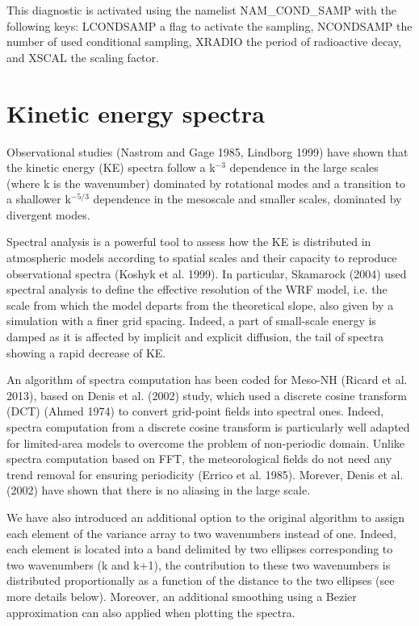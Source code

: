 This diagnostic is activated using the namelist NAM\_COND\_SAMP with the following keys:  LCONDSAMP a flag to activate the sampling, NCONDSAMP the number of used conditional sampling, XRADIO the period of radioactive decay, and XSCAL the scaling factor.
%
\section{Kinetic energy spectra}
%
Observational studies (Nastrom and Gage 1985, Lindborg 1999) have shown that the kinetic energy (KE) spectra follow a k$^{-3}$ dependence in the large scales 
(where k is the wavenumber) dominated by rotational modes and a transition to a shallower k$^{-5/3}$ dependence in the mesoscale and smaller scales, dominated by divergent modes. 


Spectral analysis is a powerful tool to assess how the KE is distributed in atmospheric models according to spatial scales and their capacity to reproduce 
observational spectra (Koshyk et al. 1999). In particular, Skamarock (2004) used spectral analysis to define the effective resolution of the WRF model, i.e. the scale from which the model departs from the theoretical slope, also given by a simulation with 
a finer grid spacing. Indeed, a part of small-scale energy is damped as it is affected by implicit and
explicit diffusion, the tail of spectra showing a rapid decrease of KE. 


An algorithm of spectra computation has been coded for Meso-NH (Ricard et al. 2013), based on Denis et al. (2002) study, which used a discrete cosine transform (DCT) 
(Ahmed 1974) to convert grid-point fields into spectral ones. 
Indeed, spectra computation from a discrete cosine transform is particularly well adapted for limited-area models
to overcome the problem of non-periodic domain. 
Unlike spectra computation based on FFT, the meteorological fields do not need any trend removal for ensuring periodicity (Errico et al. 1985). 
Morever, Denis et al. (2002) have shown that there is no aliasing in the large scale.  

We have also introduced an additional option to the original algorithm to assign each element of the variance array to two wavenumbers instead of one. 
Indeed, each element is located into a band delimited by two ellipses corresponding to two wavenumbers (k and k+1), 
the contribution to these two wavenumbers is distributed proportionally as a function of the distance to the two ellipses (see more details below). 
Moreover, an additional smoothing using a Bezier approximation can also applied when plotting the spectra. 

